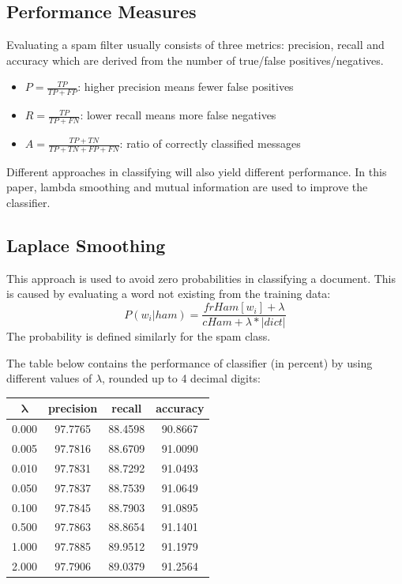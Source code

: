 \documentclass{article}
\begin{document}
\subsection{Performance Measures}
Evaluating a spam filter usually consists of three metrics: precision, recall and accuracy which are derived from the number of true/false positives/negatives.
\begin{itemize}
	\item $P = \frac{TP}{TP+FP}$: higher precision means fewer false positives
	\item $R = \frac{TP}{TP+FN}$: lower recall means more false negatives
	\item $A = \frac{TP+TN}{TP+TN+FP+FN}$: ratio of correctly classified messages
\end{itemize}

Different approaches in classifying will also yield different performance. In this paper, lambda smoothing and mutual information are used to improve the classifier.

\subsection{Laplace Smoothing}
This approach is used to avoid zero probabilities in classifying a document. This is caused by evaluating a word not existing from the training data:
\begin{equation*}
P(w_i | ham) = \frac{frHam[w_i] + \lambda}{cHam + \lambda*|dict|}
\end{equation*}
The probability is defined similarly for the spam class.

The table below contains the performance of classifier (in percent) by using different values of $\lambda$, rounded up to 4 decimal digits:

\begin{table}[H]
	\centering
	\begin{tabular}{c | c | c | c}
		$\mathbf{\lambda}$ & \textbf{precision} & \textbf{recall} & \textbf{accuracy}\\
		\hline
		0.000 & 97.7765 & 88.4598 & 90.8667 \\
		0.005 & 97.7816 & 88.6709 & 91.0090 \\
		0.010 & 97.7831 & 88.7292 & 91.0493 \\
		0.050 & 97.7837 & 88.7539 & 91.0649 \\
		0.100 & 97.7845 & 88.7903 & 91.0895 \\
		0.500 & 97.7863 & 88.8654 & 91.1401 \\
		1.000 & 97.7885 & 89.9512 & 91.1979 \\
		2.000 & 97.7906 & 89.0379 & 91.2564 \\
	\end{tabular}
\end{table}
\end{document}
